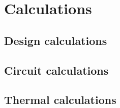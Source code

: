 \chapter{Calculations}
\label{chap:calc}


\section{Design calculations}
\label{sec:deca}

\section{Circuit calculations}
\label{sec:cica}

\section{Thermal calculations}
\label{sec:thca}
